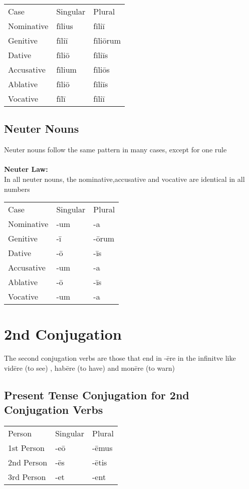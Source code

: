 \begin{tabular}{lll}
  Case & Singular & Plural \\ 
  Nominative & fīlius & fīliī \\ 
  Genitive & fīliī & fīliōrum \\ 
  Dative & fīliō & fīliīs \\ 
  Accusative & fīlium & fīliōs \\ 
  Ablative & fīliō & fīliīs \\ 
  Vocative & fīlī & fīliī \\
\end{tabular}
\subsection*{Neuter Nouns}
Neuter nouns follow the same pattern in many cases, except for one rule \\ \\
\textbf{Neuter Law:} \\ 
In all neuter nouns, the nominative,accusative and vocative are identical in all numbers\\
\begin{tabular}{lll}
 Case & Singular & Plural \\
 Nominative & -um & -a \\ 
 Genitive & -ī & -ōrum \\ 
 Dative & -ō & -īs \\ 
 Accusative & -um & -a \\ 
 Ablative & -ō & -īs \\ 
 Vocative & -um & -a
\end{tabular}
\section*{2nd Conjugation}
The second conjugation verbs are those that end in -ēre in 
the infinitve like vidēre (to see) , habēre (to have) and 
monēre (to warn) 
\subsection*{Present Tense Conjugation for 2nd Conjugation Verbs}
\begin{tabular}{lll}
  Person & Singular & Plural \\ 
  1st Person & -eō & -ēmus \\ 
  2nd Person & -ēs & -ētis \\ 
  3rd Person & -et & -ent \\ 
\end{tabular}
